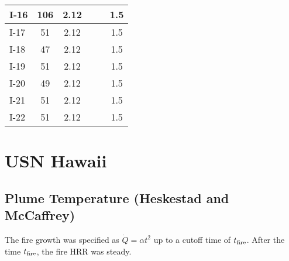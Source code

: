 \begin{table}[!ht]
\begin{center}
\begin{tabular}{|l|c|c||l|c|c|}
I-16       &  106                &  2.12      &            &                     &  1.5       \\ \hline
I-17       &  51                 &  2.12      &            &                     &  1.5       \\ \hline
I-18       &  47                 &  2.12      &            &                     &  1.5       \\ \hline
I-19       &  51                 &  2.12      &            &                     &  1.5       \\ \hline
I-20       &  49                 &  2.12      &            &                     &  1.5       \\ \hline
I-21       &  51                 &  2.12      &            &                     &  1.5       \\ \hline
I-22       &  51                 &  2.12      &            &                     &  1.5       \\ \hline
\end{tabular}
\end{center}
\end{table}


\clearpage


\section{USN Hawaii}

\subsection*{Plume Temperature (Heskestad and McCaffrey)~\cite{SFPE:Heskestad, McCaffrey:NBSIR_79-1910}}

The fire growth was specified as $\dot Q = \alpha t^2$ up to a cutoff time of $t\sb{fire}$.
After the time $t\sb{fire}$, the fire HRR was steady.

